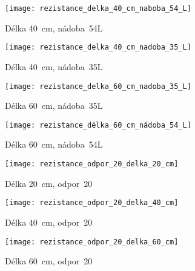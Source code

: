 \begin{figure}[ht]
	\label{img:pic_rezistance_delka_40_cm_naboba_54_L}
	\begin{center}
		\texttt{[image: rezistance\_delka\_40\_cm\_naboba\_54\_L]}
		\caption{Délka \SI{40}{cm}, nádoba~54L}
	\end{center}
\end{figure}

\begin{figure}[ht]
	\label{img:pic_rezistance_delka_40_cm_nadoba_35_L}
	\begin{center}
		\texttt{[image: rezistance\_delka\_40\_cm\_nadoba\_35\_L]}
		\caption{Délka \SI{40}{cm}, nádoba~35L}
	\end{center}
\end{figure}

\begin{figure}[ht]
	\label{img:pic_rezistance_delka_60_cm_nadoba_35_L}
	\begin{center}
		\texttt{[image: rezistance\_delka\_60\_cm\_nadoba\_35\_L]}
		\caption{Délka \SI{60}{cm}, nádoba~35L}
	\end{center}
\end{figure}

\begin{figure}[ht]
	\label{img:pic_rezistance_délka_60_cm_nádoba_54_L}
	\begin{center}
		\texttt{[image: rezistance\_délka\_60\_cm\_nádoba\_54\_L]}
		\caption{Délka \SI{60}{cm}, nádoba~54L}
	\end{center}
\end{figure}


\begin{figure}[ht]
	\label{img:pic_rezistance_odpor_20_delka_20_cm}
	\begin{center}
		\texttt{[image: rezistance\_odpor\_20\_delka\_20\_cm]}
		\caption{Délka \SI{20}{cm}, odpor~20}
	\end{center}
\end{figure}


\begin{figure}[ht]
	\label{img:pic_rezistance_odpor_20_delka_40_cm}
	\begin{center}
		\texttt{[image: rezistance\_odpor\_20\_delka\_40\_cm]}
		\caption{Délka \SI{40}{cm}, odpor~20}
	\end{center}
\end{figure}

\begin{figure}[ht]
	\label{img:pic_rezistance_odpor_20_delka_60_cm}
	\begin{center}
		\texttt{[image: rezistance\_odpor\_20\_delka\_60\_cm]}
		\caption{Délka \SI{60}{cm}, odpor~20}
	\end{center}
\end{figure}

